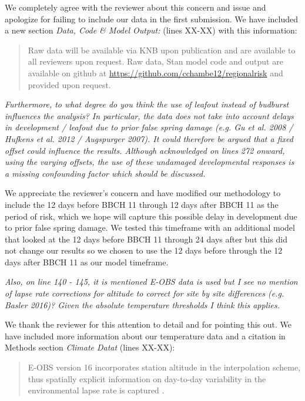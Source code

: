 \documentclass[11pt,a4paper]{article}
\begin{document}
We completely agree with the reviewer about this concern and issue and apologize for failing to include our data in the first submission. We have included a new section \textit{Data, Code \& Model Output:} (lines XX-XX) with this information:

\begin{quotation}
\noindent  Raw data will be available via KNB upon publication and are available to all reviewers upon request. Raw data, {Stan} model code and output are available on github at \url{https://github.com/cchambe12/regionalrisk} and provided upon request.
\end{quotation}

\textit{Furthermore, to what degree do you think the use of leafout instead of budburst influences the analysis? In particular, the data does not take into account delays in development / leafout due to prior false spring damage (e.g. Gu et al. 2008 / Hufkens et al. 2012 / Augspurger 2007). It could therefore be argued that a fixed offset could influence the results. Although acknowledged on lines 272 onward, using the varying offsets, the use of these undamaged developmental responses is a missing confounding factor which should be discussed.}

We appreciate the reviewer's concern and have modified our methodology to include the 12 days before BBCH 11 through 12 days after BBCH 11 as the period of risk, which we hope will capture this possible delay in development due to prior false spring damage. We tested this timeframe with an additional model that looked at the 12 days before BBCH 11 through 24 days after but this did not change our results so we chosen to use the 12 days before through the 12 days after BBCH 11 as our model timeframe.

\textit{Also, on line 140 - 145, it is mentioned E-OBS data is used but I see no mention of lapse rate corrections for altitude to correct for site by site differences (e.g. Basler 2016)? Given the absolute temperature thresholds I think this applies.}

We thank the reviewer for this attention to detail and for pointing this out. We have included more information about our temperature data and a citation in Methods section \textit{Climate Datat} (lines XX-XX):

\begin{quotation}
\noindent  E-OBS version 16 incorporates station altitude in the interpolation scheme, thus spatially explicit information on day-to-day variability in the environmental lapse rate is captured \citep{Cornes2018}.
\end{quotation}
\end{document}
